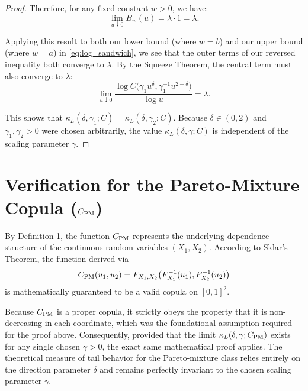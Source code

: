 \documentclass{article}
\begin{document}
\begin{proof}
Therefore, for any fixed constant $w > 0$, we have:
\[
\lim_{u\downarrow 0} B_w(u) = \lambda \cdot 1 = \lambda.
\]

Applying this result to both our lower bound (where $w=b$) and our upper bound (where $w=a$) in \eqref{eq:log_sandwich}, we see that the outer terms of our reversed inequality both converge to $\lambda$. By the Squeeze Theorem, the central term must also converge to $\lambda$:
\[
\lim_{u\downarrow 0} \frac{\log C\!\bigl(\gamma_1 u^\delta, \gamma_1^{-1}u^{2-\delta}\bigr)}{\log u} = \lambda.
\]

This shows that $\kappa_L(\delta,\gamma_1;C) = \kappa_L(\delta,\gamma_2;C)$. Because $\delta \in (0,2)$ and $\gamma_1, \gamma_2 > 0$ were chosen arbitrarily, the value $\kappa_L(\delta,\gamma;C)$ is independent of the scaling parameter $\gamma$.
\end{proof}

\section*{Verification for the Pareto-Mixture Copula ($C_{\rm PM}$)}

By Definition 1, the function $C_{\rm PM}$ represents the underlying dependence structure of the continuous random variables $(X_1, X_2)$. According to Sklar's Theorem, the function derived via 
\[
C_{\rm PM}(u_1, u_2) = F_{X_1, X_2}\big(F_{X_1}^{-1}(u_1), F_{X_2}^{-1}(u_2)\big)
\]
is mathematically guaranteed to be a valid copula on $[0, 1]^2$. 

Because $C_{\rm PM}$ is a proper copula, it strictly obeys the property that it is non-decreasing in each coordinate, which was the foundational assumption required for the proof above. Consequently, provided that the limit $\kappa_L(\delta,\gamma;C_{\rm PM})$ exists for any single chosen $\gamma > 0$, the exact same mathematical proof applies. The theoretical measure of tail behavior for the Pareto-mixture class relies entirely on the direction parameter $\delta$ and remains perfectly invariant to the chosen scaling parameter $\gamma$.
\end{document}
